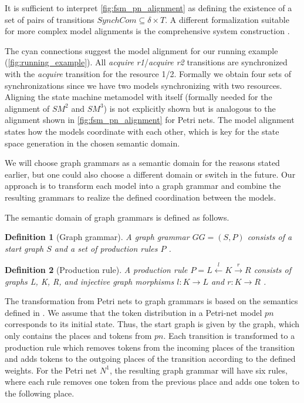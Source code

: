 \documentclass[conference]{IEEEtran}
\newtheorem{definition}{Definition}
\begin{document}
It is sufficient to interpret \autoref{fig:fsm_pn_alignment} as defining the existence of a set of pairs of transitions $SynchCom \subseteq \delta \times T$.
A different formalization suitable for more complex model alignments is the comprehensive system construction \cite{stunkelMultipleModelSynchronization2020}.

The cyan connections suggest the model alignment for our running example (\autoref{fig:running_example}).
All \textit{acquire r1}/\textit{acquire r2} transitions are synchronized with the \textit{acquire} transition for the resource 1/2.
Formally we obtain four sets of synchronizations since we have two models synchronizing with two resources.
Aligning the state machine metamodel with itself (formally needed for the alignment of $SM^2$ and $SM^3$) is not explicitly shown but is analogous to the alignment shown in \autoref{fig:fsm_pn_alignment} for Petri nets.
The model alignment states how the models coordinate with each other, which is key for the state space generation in the chosen semantic domain.

We will choose graph grammars as a semantic domain for the reasons stated earlier, but one could also choose a different domain or switch in the future.
Our approach is to transform each model into a graph grammar and combine the resulting grammars to realize the defined coordination between the models.

The semantic domain of graph grammars is defined as follows.
\begin{definition}[Graph grammar] \label{def:graphGrammar}
A graph grammar $GG=(S, P)$ consists of a start graph $S$ and a set of production rules $P$ \cite{ehrigGraphGrammarsPetri2004}. 
\end{definition}
\begin{definition}[Production rule] \label{def:productionRule}
A production rule $P= L \overset{l}{\leftarrow} K \overset{r}{\to} R$ consists of graphs L, K, R, and injective graph morphisms $l: K \to L$ and $r: K \to R$ \cite{ehrigGraphGrammarsPetri2004}. 
\end{definition}

The transformation from Petri nets to graph grammars is based on the semantics defined in \cite{ehrigGraphGrammarsPetri2004}.
We assume that the token distribution in a Petri-net model $pn$ corresponds to its initial state.
Thus, the start graph is given by the graph, which only contains the places and tokens from $pn$.
Each transition is transformed to a production rule which removes tokens from the incoming places of the transition and adds tokens to the outgoing places of the transition according to the defined weights.
For the Petri net $N^1$, the resulting graph grammar will have six rules, where each rule removes one token from the previous place and adds one token to the following place.
\end{document}
